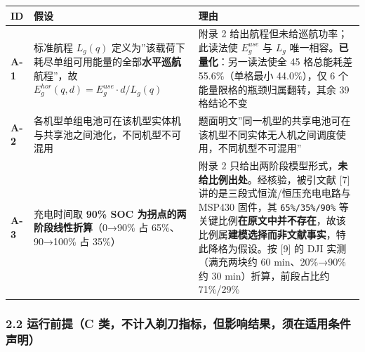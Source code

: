 \documentclass[
  10.5pt,
]{article}
\newcounter{none} %
\begin{document}
{\def\LTcaptype{none} %
\begin{longtable}[]{@{}
  >{\raggedright\arraybackslash}p{}
  >{\raggedright\arraybackslash}p{}
  >{\raggedright\arraybackslash}p{}@{}}
\toprule\noalign{}
\begin{minipage}[b]{\linewidth}\raggedright
ID
\end{minipage} & \begin{minipage}[b]{\linewidth}\raggedright
假设
\end{minipage} & \begin{minipage}[b]{\linewidth}\raggedright
理由
\end{minipage} \\
\midrule\noalign{}
\endhead
\bottomrule\noalign{}
\endlastfoot
\textbf{A-1} & 标准航程 \(L_g(q)\)
定义为''该载荷下耗尽单组可用能量的全部\textbf{水平巡航}航程''，故
\(E^{hor}_g(q,d)=E^{use}_g\cdot d/L_g(q)\) & 附录 2
给出航程但未给巡航功率；此读法使 \(E^{use}_g\) 与 \(L_g\)
唯一相容。\textbf{已量化}：另一读法使全 45 格总能耗差 55.6\%（单格最小
44.0\%），仅 6 个能量限格的瓶颈归属翻转，其余 39 格结论不变 \\
\textbf{A-2} &
各机型单组电池可在该机型实体机与共享池之间池化，不同机型不可混用 &
题面明文''同一机型的共享电池可在该机型不同实体无人机之间调度使用，不同机型不可混用'' \\
\textbf{A-3} & 充电时间取 \textbf{90\% SOC
为拐点的两阶段线性折算}（0→90\% 占 65\%、90→100\% 占 35\%） & 附录 2
只给出两阶段模型形式，\textbf{未给比例出处}。经核验，被引文献 {[}7{]}
讲的是三段式恒流/恒压充电电路与 MSP430 固件，其 \texttt{65\%/35\%/90\%}
等关键比例\textbf{在原文中并不存在}，故该比例属\textbf{建模选择而非文献事实}，特此降格为假设。按
{[}9{]} 的 DJI 实测（满充两块约 60 min、20\%→90\% 约 30
min）折算，前段占比约 71\%/29\% \\
\end{longtable}
}

\subsubsection{2.2 运行前提（C
类，不计入剃刀指标，但影响结果，须在适用条件声明）}\label{ux8fd0ux884cux524dux63d0c-ux7c7bux4e0dux8ba1ux5165ux5243ux5200ux6307ux6807ux4f46ux5f71ux54cdux7ed3ux679cux987bux5728ux9002ux7528ux6761ux4ef6ux58f0ux660e}
\end{document}
